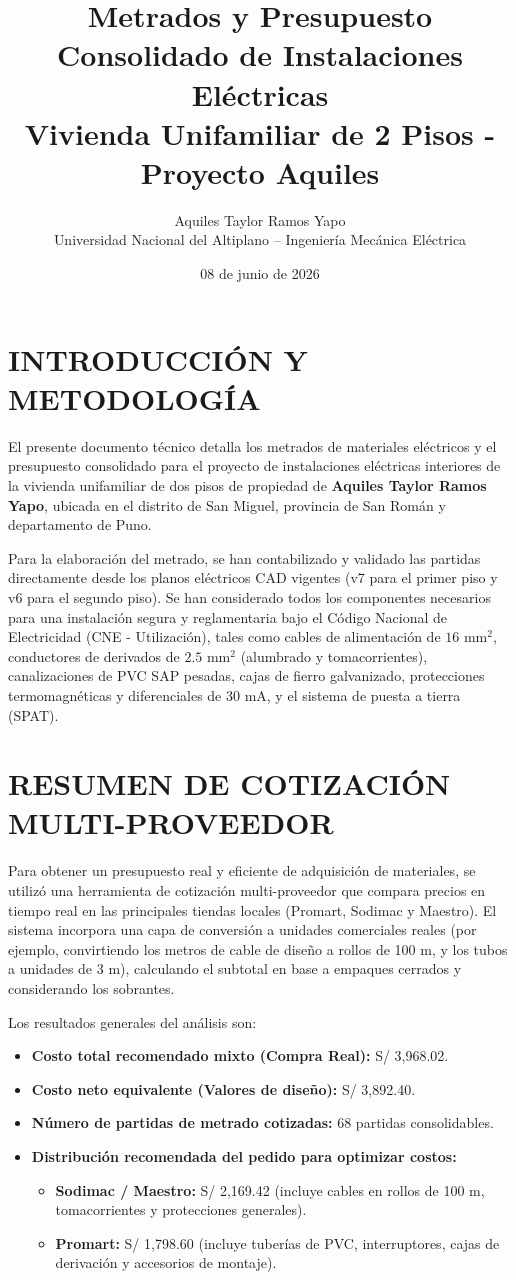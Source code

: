 \documentclass[11pt,a4paper]{article}
\title{Metrados y Presupuesto Consolidado de Instalaciones Eléctricas\\Vivienda Unifamiliar de 2 Pisos - Proyecto Aquiles}
\author{Aquiles Taylor Ramos Yapo\\Universidad Nacional del Altiplano -- Ingeniería Mecánica Eléctrica}
\date{08 de junio de 2026}
\begin{document}
\maketitle

\section{INTRODUCCIÓN Y METODOLOGÍA}
El presente documento técnico detalla los metrados de materiales eléctricos y el presupuesto consolidado para el proyecto de instalaciones eléctricas interiores de la vivienda unifamiliar de dos pisos de propiedad de \textbf{Aquiles Taylor Ramos Yapo}, ubicada en el distrito de San Miguel, provincia de San Román y departamento de Puno.

Para la elaboración del metrado, se han contabilizado y validado las partidas directamente desde los planos eléctricos CAD vigentes (v7 para el primer piso y v6 para el segundo piso). Se han considerado todos los componentes necesarios para una instalación segura y reglamentaria bajo el Código Nacional de Electricidad (CNE - Utilización), tales como cables de alimentación de $16\text{ mm}^2$, conductores de derivados de $2.5\text{ mm}^2$ (alumbrado y tomacorrientes), canalizaciones de PVC SAP pesadas, cajas de fierro galvanizado, protecciones termomagnéticas y diferenciales de $30\text{ mA}$, y el sistema de puesta a tierra (SPAT).

\section{RESUMEN DE COTIZACIÓN MULTI-PROVEEDOR}
Para obtener un presupuesto real y eficiente de adquisición de materiales, se utilizó una herramienta de cotización multi-proveedor que compara precios en tiempo real en las principales tiendas locales (Promart, Sodimac y Maestro). El sistema incorpora una capa de conversión a unidades comerciales reales (por ejemplo, convirtiendo los metros de cable de diseño a rollos de 100 m, y los tubos a unidades de 3 m), calculando el subtotal en base a empaques cerrados y considerando los sobrantes.

Los resultados generales del análisis son:
\begin{itemize}
  \item \textbf{Costo total recomendado mixto (Compra Real):} S/ 3,968.02.
  \item \textbf{Costo neto equivalente (Valores de diseño):} S/ 3,892.40.
  \item \textbf{Número de partidas de metrado cotizadas:} 68 partidas consolidables.
  \item \textbf{Distribución recomendada del pedido para optimizar costos:}
    \begin{itemize}
      \item \textbf{Sodimac / Maestro:} S/ 2,169.42 (incluye cables en rollos de 100 m, tomacorrientes y protecciones generales).
      \item \textbf{Promart:} S/ 1,798.60 (incluye tuberías de PVC, interruptores, cajas de derivación y accesorios de montaje).
    \end{itemize}
\end{itemize}

\clearpage

\end{document}
